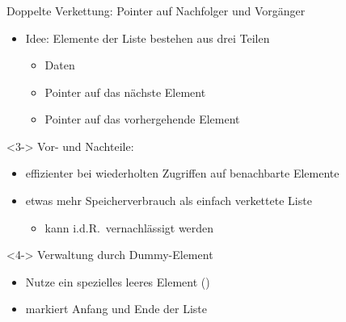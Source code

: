 \begin{frame}
\frametitle{\insertsection}
\begin{block}
{Doppelte Verkettung: Pointer auf Nachfolger und Vorgänger}
\begin{itemize}
	\item<2-> Idee: Elemente der Liste bestehen aus drei Teilen
	\begin{itemize}
		\item Daten
		\item Pointer auf das nächste Element
		\item Pointer auf das vorhergehende Element
	\end{itemize}
\end{itemize}
\end{block}
\begin{block}<3->
{Vor- und Nachteile:}
\begin{itemize}
	\item effizienter bei wiederholten Zugriffen auf benachbarte Elemente
	\item etwas mehr Speicherverbrauch als einfach verkettete Liste
	\begin{itemize}
		\item kann i.d.R.\ vernachlässigt werden
	\end{itemize}
\end{itemize}
\end{block}
\begin{block}<4->
{Verwaltung durch Dummy-Element}
\begin{itemize}
	\item Nutze ein spezielles leeres Element ()
	\item markiert Anfang und Ende der Liste
\end{itemize}
\end{block}
\end{frame}

